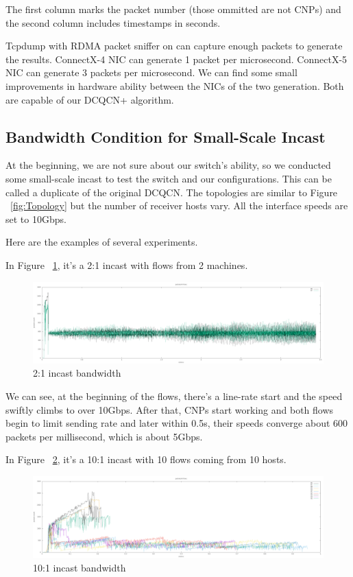 \documentclass[12pt,a4paper]{article}
\begin{document}
The first column marks the packet number (those ommitted are not CNPs) and the second column includes timestamps in seconds.

Tcpdump with RDMA packet sniffer on can capture enough packets to generate the results.
ConnectX-4 NIC can generate 1 packet per microsecond.
ConnectX-5 NIC can generate 3 packets per microsecond.
We can find some small improvements in hardware ability between the NICs of the two generation.
Both are capable of our DCQCN+ algorithm.

\subsection{Bandwidth Condition for Small-Scale Incast}
At the beginning, we are not sure about our switch's ability, so we conducted some small-scale incast to test the switch and our configurations.
This can be called a duplicate of the original DCQCN.
The topologies are similar to Figure ~\ref{fig:Topology} but the number of receiver hosts vary.
All the interface speeds are set to 10Gbps.

Here are the examples of several experiments.

In Figure ~\ref{fig:2on1_1}, it's a 2:1 incast with flows from 2 machines.

\begin{figure}[ht]
	\begin{center}
		\includegraphics[width=6in]{2on1_1}
		\caption{2:1 incast bandwidth}
		\label{fig:2on1_1}
	\end{center}
\end{figure}

We can see, at the beginning of the flows, there's a line-rate start and the speed swiftly climbs to over 10Gbps.
After that, CNPs start working and both flows begin to limit sending rate and later within 0.5s, their speeds converge about
600 packets per millisecond, which is about 5Gbps.

In Figure ~\ref{fig:10on1_1}, it's a 10:1 incast with 10 flows coming from 10 hosts.

\begin{figure}[ht]
	\begin{center}
		\includegraphics[width=6in]{10on1_1}
		\caption{10:1 incast bandwidth}
		\label{fig:10on1_1}
	\end{center}
\end{figure}
\end{document}
